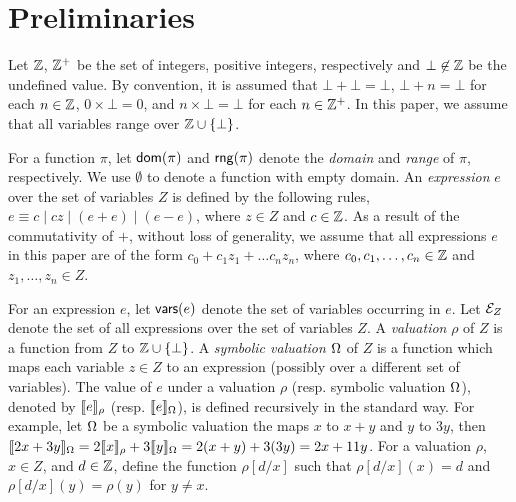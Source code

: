 
\section{Preliminaries}
\label{sec:preliminaries}
Let ${\mathbb{Z} }$,  ${\mathbb{Z} }^+$ be the set of integers, positive integers, respectively and $\bot \not \in {\mathbb{Z} }$ be  the undefined value. By convention, it is assumed that $\bot + \bot = \bot$, $\bot + n = \bot$ for each $n \in {\mathbb{Z} }$, $0 \times \bot = 0$, and $n \times \bot = \bot$ for each $n \in {\mathbb{Z} }^+$.
In this paper, we assume that all variables range over ${\mathbb{Z} } \cup \{\bot\}$.  

For a function $\pi$, let $\mathsf{dom}(\pi)$ and $\mathsf{rng}(\pi)$ denote the \emph{domain}  and \emph{range} of $\pi$, respectively. We use $\emptyset$ to denote a function with empty domain. An \emph{expression} $e$ over the set of variables $Z$ is defined by the following rules, $e\equiv  c \mid  c z \mid (e + e) \mid (e - e)$, where $z \in Z$ and $c\in {\mathbb{Z} }$.  As a result of the commutativity of $+$, without loss of generality, we assume that all expressions $e$ in this paper are of the form $c_0 + c_1 z_1 + \dots c_n z_n$, where $c_0, c_1,\dots,c_n \in {\mathbb{Z} }$ and $z_1,\dots,z_n \in Z$. 


For an expression $e$, let $\mathsf{vars}(e)$ denote the set of variables occurring in $e$. Let ${\mathcal{E} }_Z$ denote the set of all expressions over the set of variables $Z$. 
A \emph{valuation} $\rho$ of $Z$ is a function from $Z$ to ${\mathbb{Z} }\cup\{\bot\}$. A \emph{symbolic valuation} $\Omega$ of $Z$ is a function which maps each variable $z \in Z$ to an expression (possibly over a different set of variables). The value of $e$ under a valuation $\rho$ (resp. symbolic valuation $\Omega$), denoted by $\llbracket e\rrbracket_{\rho}$ (resp. $\llbracket e\rrbracket_{\Omega}$), is defined recursively in the standard way. For example, let $\Omega$ be a symbolic valuation the maps $x$ to $x+y$ and $y$ to $3y$, then $\llbracket2x+3y\rrbracket_{\Omega}=2\llbracket x\rrbracket_{\rho}+3\llbracket y\rrbracket_{\Omega}=2(x+y)+3(3y)=2x+11y$.
For a valuation $\rho$, $x \in Z$, and $d \in {\mathbb{Z} }$, define the function $\rho[d/x]$ such that $\rho[d/x](x)=d$ and $\rho[d/x](y)=\rho(y)$ for $y\neq x$. 

